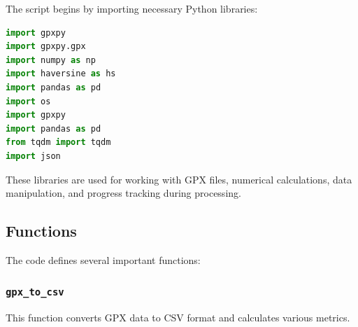 The script begins by importing necessary Python libraries:

\begin{lstlisting}[language=Python]
import gpxpy
import gpxpy.gpx
import numpy as np
import haversine as hs
import pandas as pd
import os
import gpxpy
import pandas as pd
from tqdm import tqdm
import json
\end{lstlisting}

These libraries are used for working with GPX files, numerical calculations, data manipulation, and progress tracking during processing.

\subsection{Functions}

The code defines several important functions:

\subsubsection{\texttt{gpx\_to\_csv}}

This function converts GPX data to CSV format and calculates various metrics.


